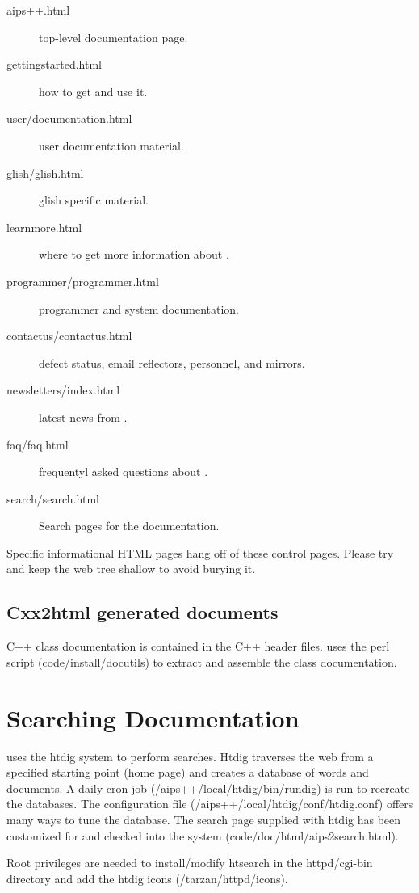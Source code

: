 \begin{description}
\item[aips++.html] \aips top-level documentation page.
\item[gettingstarted.html]how to get \aips and use it.
\item[user/documentation.html]user documentation material.
\item[glish/glish.html]glish specific material.
\item[learnmore.html]where to get more information about \aips.
\item[programmer/programmer.html]programmer and system documentation.
\item[contactus/contactus.html]defect status, email reflectors, personnel, and mirrors.
\item[newsletters/index.html]latest news from \aips.
\item[faq/faq.html]frequentyl asked questions about \aips.
\item[search/search.html] Search pages for the documentation.
\end{description}

Specific informational HTML pages hang off of these control pages.  Please try and keep the
web tree shallow to avoid burying it.


\subsection{Cxx2html generated documents}
C++ class documentation is contained in the C++ header files. \aips uses 
the perl script
 (code/install/docutils) to
extract and assemble the class documentation.

\section{Searching \aips Documentation}
\aips uses the htdig system  to perform searches.
Htdig traverses the web from a specified starting point (\aips home
page) and creates a database of words and documents.  A daily cron job
(/aips++/local/htdig/bin/rundig) is run
to recreate the databases.  The configuration file
(/aips++/local/htdig/conf/htdig.conf)
offers many ways to tune the database.  The search page supplied with
htdig has been customized for \aips and checked into the system
(code/doc/html/aips2search.html). 

Root privileges are needed to install/modify htsearch in the httpd/cgi-bin
directory and add the htdig icons (/tarzan/httpd/icons).

